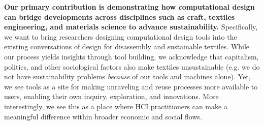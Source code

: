 \documentclass{sigchi}
\renewcommand\todo[1]{\emph{\color{red}[#1]}}
\begin{document}



\textbf{Our primary contribution is demonstrating how computational design can bridge developments across disciplines such as craft, textiles engineering, and materials science to advance sustainability.} Specifically, we want to bring researchers designing computational design tools into the existing conversations of design for disassembly and sustainable textiles. While our process yields insights through tool building, we acknowledge that capitalism, politics, and other sociological factors also make textiles unsustainable (e.g. we do not have sustainability problems \textit{because} of our tools and machines alone). Yet, we see tools as a site for making unraveling and reuse processes more available to users, enabling their own inquiry, exploration, and innovations. More interestingly, we see this as a place where HCI practitioners can make a meaningful difference within broader economic and social flows.  
\end{document}
